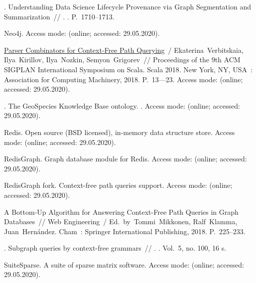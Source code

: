 \begin{thebibliography}{10}
. Understanding Data Science Lifecycle
  Provenance via Graph Segmentation and Summarization~// . \BibDash
{}. \BibDash
\newblock P.~1710--1713.

Neo4j. \BibDash
\newblock Access mode:  (online; accessed:
  29.05.2020).

\href{http://dx.doi.org/10.1145/3241653.3241655}{Parser Combinators for
  Context-Free Path Querying}~/ Ekaterina~Verbitskaia, Ilya~Kirillov,
  Ilya~Nozkin, Semyon~Grigorev~// Proceedings of the 9th ACM SIGPLAN
  International Symposium on Scala. \BibDash
\newblock Scala 2018. \BibDash
\newblock New York, NY, USA~: Association for Computing Machinery, 2018.
  \BibDash
\newblock P.~13–--23. \BibDash
\newblock Access mode: 
  (online; accessed: 29.05.2020).

. The GeoSpecies Knowledge Base ontology. \BibDash
{}. \BibDash
\newblock Access mode: 
  (online; accessed: 29.05.2020).

Redis. Open source (BSD licensed), in-memory data structure store. \BibDash
\newblock Access mode:  (online; accessed:
  29.05.2020).

RedisGraph. Graph database module for Redis. \BibDash
\newblock Access mode:  (online;
  accessed: 29.05.2020).

RedisGraph fork. Context-free path queries support. \BibDash
\newblock Access mode:
  (online; accessed: 29.05.2020).

 A Bottom-Up
  Algorithm for Answering Context-Free Path Queries in Graph Databases~// Web
  Engineering~/ Ed.\ by\ Tommi~Mikkonen, Ralf~Klamma, Juan~Hern{\'a}ndez.
  \BibDash
\newblock Cham~: Springer International Publishing, 2018. \BibDash
\newblock P.~225--233.

. Subgraph queries by context-free
  grammars~// . \BibDash
{}. \BibDash
\newblock Vol.~5, no. 100, 16 s.

SuiteSparse. A suite of sparse matrix software. \BibDash
\newblock Access mode:  (online;
  accessed: 29.05.2020).

\end{thebibliography}
